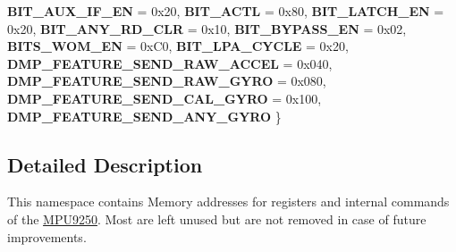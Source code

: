 \begin{DoxyCompactItemize}
$${\bfseries B\+I\+T\+\_\+\+A\+U\+X\+\_\+\+I\+F\+\_\+\+EN} = 0x20, 
{\bfseries B\+I\+T\+\_\+\+A\+C\+TL} = 0x80, 
{\bfseries B\+I\+T\+\_\+\+L\+A\+T\+C\+H\+\_\+\+EN} = 0x20, 
\newline
{\bfseries B\+I\+T\+\_\+\+A\+N\+Y\+\_\+\+R\+D\+\_\+\+C\+LR} = 0x10, 
{\bfseries B\+I\+T\+\_\+\+B\+Y\+P\+A\+S\+S\+\_\+\+EN} = 0x02, 
{\bfseries B\+I\+T\+S\+\_\+\+W\+O\+M\+\_\+\+EN} = 0x\+C0, 
{\bfseries B\+I\+T\+\_\+\+L\+P\+A\+\_\+\+C\+Y\+C\+LE} = 0x20, 
\newline
{\bfseries D\+M\+P\+\_\+\+F\+E\+A\+T\+U\+R\+E\+\_\+\+S\+E\+N\+D\+\_\+\+R\+A\+W\+\_\+\+A\+C\+C\+EL} = 0x040, 
{\bfseries D\+M\+P\+\_\+\+F\+E\+A\+T\+U\+R\+E\+\_\+\+S\+E\+N\+D\+\_\+\+R\+A\+W\+\_\+\+G\+Y\+RO} = 0x080, 
{\bfseries D\+M\+P\+\_\+\+F\+E\+A\+T\+U\+R\+E\+\_\+\+S\+E\+N\+D\+\_\+\+C\+A\+L\+\_\+\+G\+Y\+RO} = 0x100, 
{\bfseries D\+M\+P\+\_\+\+F\+E\+A\+T\+U\+R\+E\+\_\+\+S\+E\+N\+D\+\_\+\+A\+N\+Y\+\_\+\+G\+Y\+RO}
 \}
\end{DoxyCompactItemize}


\subsection{Detailed Description}
This namespace contains Memory addresses for registers and internal commands of the \mbox{\hyperlink{namespace_m_p_u9250}{M\+P\+U9250}}. Most are left unused but are not removed in case of future improvements. 